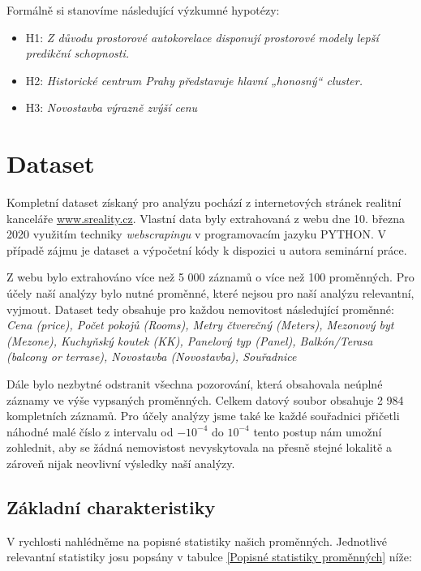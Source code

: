 \documentclass[11pt, a4paper]{article}
\begin{document}
Formálně si stanovíme následující výzkumné hypotézy:

\begin{itemize}
\item H{1}: \textit{Z důvodu prostorové autokorelace disponují prostorové modely lepší predikční schopnosti.}

\item H{2}: \textit{Historické centrum Prahy představuje hlavní „honosný“ cluster.}
    
\item H{3}: \textit{Novostavba výrazně zvýší cenu}
\end{itemize}

\section{Dataset}

Kompletní dataset získaný pro analýzu pochází z internetových stránek realitní kanceláře \url{www.sreality.cz}. Vlastní data byly extrahovaná z webu dne 10. března 2020 využitím techniky \textit{webscrapingu} v programovacím jazyku PYTHON. V případě zájmu je dataset a výpočetní kódy k dispozici u autora seminární práce. 

Z webu bylo extrahováno více než 5 000 záznamů o více než 100 proměnných. Pro účely naší analýzy bylo nutné proměnné, které nejsou pro naší analýzu relevantní, vyjmout. Dataset tedy obsahuje pro každou nemovitost následující proměnné: \textit{Cena (price), Počet pokojů (Rooms), Metry čtverečný (Meters), Mezonový byt (Mezone), Kuchyňský koutek (KK), Panelový typ (Panel), Balkón/Terasa (balcony or terrase), Novostavba (Novostavba), Souřadnice} 

Dále bylo nezbytné odstranit všechna pozorování, která obsahovala neúplné záznamy ve výše vypsaných proměnných. Celkem datový soubor obsahuje 2 984 kompletních záznamů. Pro účely analýzy jsme také ke každé souřadnici přičetli náhodné malé číslo z intervalu od $-10^{-4}$ do $10^{-4}$ tento postup nám umožní zohlednit, aby se žádná nemovistost nevyskytovala na přesně stejné lokalitě a zároveň nijak neovlivní výsledky naší analýzy.

\subsection{Základní charakteristiky}

V rychlosti nahlédněme na popisné statistiky našich proměnných. Jednotlivé relevantní statistiky josu popsány v tabulce \ref{Popisné statistiky proměnných} níže:
\end{document}
